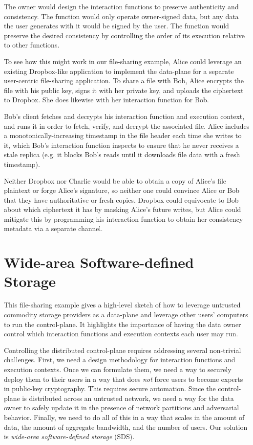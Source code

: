 The owner would design the interaction functions to preserve authenticity
and consistency.  The function would only operate owner-signed data, but any
data the user generates with it would be signed by the user.  The function would
preserve the desired consistency by controlling the order of its execution
relative to other functions.

To see how this might work in our file-sharing example, Alice could leverage
an existing Dropbox-like application to implement the data-plane for a separate
user-centric file-sharing application.  To
share a file with Bob, Alice encrypts the file with his
public key, signs it with her private key, and uploads the ciphertext to Dropbox. 
She does likewise with her interaction function for Bob.

Bob's client fetches and decrypts his interaction function and execution context,
and runs it in order to fetch, verify, and decrypt the associated file.
Alice includes a monotonically-increasing timestamp in the file header each time she
writes to it, which Bob's interaction function inspects to ensure that he
never receives a stale replica (e.g. it blocks Bob's reads until it downloads
file data with a fresh timestamp).

Neither Dropbox nor Charlie would be able to obtain a
copy of Alice's file plaintext or forge Alice's signature, so neither one could
convince Alice or Bob that they have authoritative or fresh copies.  
Dropbox could equivocate to Bob about which ciphertext it has
by masking Alice's future writes, but Alice could mitigate this
by programming his interaction function to obtain her consistency metadata via a separate
channel.

\section{Wide-area Software-defined Storage}

This file-sharing example gives a high-level sketch of how 
to leverage untrusted commodity storage providers as a data-plane
and leverage other users' computers to run the control-plane.
It highlights the importance of having the data owner control which
interaction functions and execution contexts each user may run.

Controlling the distributed control-plane requires addressing several non-trivial 
challenges.  First, we need a design methodology for interaction functions and
execution contexts.  Once we can formulate them, we need a way to securely
deploy them to their users in a way that does \emph{not} force users to become experts in
public-key cryptography.  This requires secure automation.
Since the control-plane is distributed across an untrusted network, we need a
way for the data owner to safely update it in the presence of network partitions and adversarial
behavior.  Finally, we need to do all of this in a way that scales in the amount
of data, the amount of aggregate bandwidth, and the number of users.  Our
solution is \emph{wide-area software-defined storage} (SDS).

